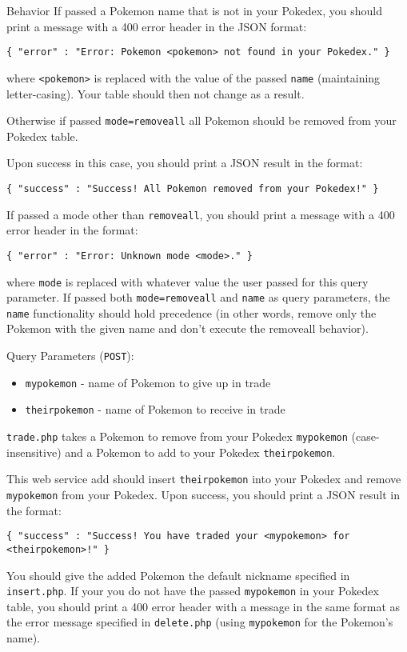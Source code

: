 \documentclass[programming]{../../../../mfcs}
\begin{document}
\begin{question}{Behavior}
  If passed a Pokemon name that is not in your Pokedex, you should print a message with a 400 error
  header in the JSON format: 
  \begin{verbatim}{ "error" : "Error: Pokemon <pokemon> not found in your Pokedex." }\end{verbatim}
   where \texttt{<pokemon>} is replaced with the value of the passed \texttt{name} (maintaining
  letter-casing). Your table should then not change as a result.
  \newline

  Otherwise if passed \texttt{mode=removeall} all Pokemon should be removed from your Pokedex table.
  \newpage

  Upon success in this case, you should print a JSON result in the format:
  \begin{verbatim}
{ "success" : "Success! All Pokemon removed from your Pokedex!" }\end{verbatim}

  If passed a mode other than \texttt{removeall}, you should print a message with a 400 error header
  in the format: 
  \begin{verbatim}{ "error" : "Error: Unknown mode <mode>." }\end{verbatim}
  where \texttt{mode} is replaced with whatever
  value the user passed for this query parameter. If passed both \texttt{mode=removeall} and
  \texttt{name} as query parameters, the \texttt{name} functionality should hold precedence (in
  other words, remove only the Pokemon with the given name and don't execute the removeall
  behavior).

  Query Parameters (\texttt{POST}):
  \begin{itemize}
    \item \texttt{mypokemon} - name of Pokemon to give up in trade
    \item \texttt{theirpokemon} - name of Pokemon to receive in trade
  \end{itemize}
  \texttt{trade.php} takes a Pokemon to remove from your Pokedex
  \texttt{mypokemon} (case-insensitive) and a Pokemon to add to your Pokedex \texttt{theirpokemon}. 
  \newline

  This web service add should insert \texttt{theirpokemon} into your Pokedex and remove
  \texttt{mypokemon} from your Pokedex. Upon success, you should print a JSON result in the format: 
  \begin{verbatim}
{ "success" : "Success! You have traded your <mypokemon> for <theirpokemon>!" }\end{verbatim}
  You should give the added Pokemon the default nickname specified in \texttt{insert.php}. If your you do not have the passed \texttt{mypokemon} in your Pokedex table, you should print a
  400 error header with a message in the same format as the error message specified in
  \texttt{delete.php} (using \texttt{mypokemon} for the Pokemon's name).
  \newline


\end{question}
\end{document}
